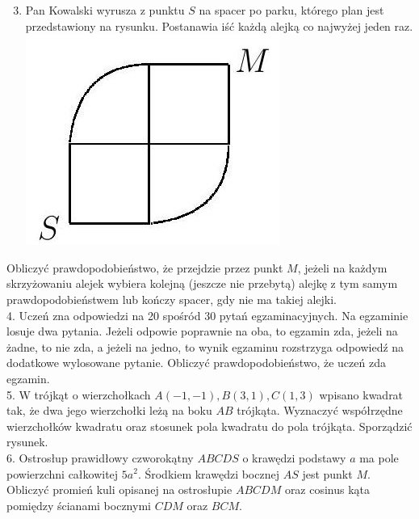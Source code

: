 \documentclass[10pt]{article}
\begin{document}
\begin{enumerate}
  \setcounter{enumi}{2}
  \item Pan Kowalski wyrusza z punktu $S$ na spacer po parku, którego plan jest przedstawiony na rysunku. Postanawia iść każdą alejką co najwyżej jeden raz.\\
\includegraphics[max width=\textwidth, center]{2024_11_16_62d9cd06022f1460c234g-10}
\end{enumerate}

Obliczyć prawdopodobieństwo, że przejdzie przez punkt $M$, jeżeli na każdym skrzyżowaniu alejek wybiera kolejną (jeszcze nie przebytą) alejkę z tym samym prawdopodobieństwem lub kończy spacer, gdy nie ma takiej alejki.\\
4. Uczeń zna odpowiedzi na 20 spośród 30 pytań egzaminacyjnych. Na egzaminie losuje dwa pytania. Jeżeli odpowie poprawnie na oba, to egzamin zda, jeżeli na żadne, to nie zda, a jeżeli na jedno, to wynik egzaminu rozstrzyga odpowiedź na dodatkowe wylosowane pytanie. Obliczyć prawdopodobieństwo, że uczeń zda egzamin.\\
5. W trójkąt o wierzchołkach $A(-1,-1), B(3,1), C(1,3)$ wpisano kwadrat tak, że dwa jego wierzchołki leżą na boku $A B$ trójkąta. Wyznaczyć współrzędne wierzchołków kwadratu oraz stosunek pola kwadratu do pola trójkąta. Sporządzić rysunek.\\
6. Ostrosłup prawidłowy czworokątny $A B C D S$ o krawędzi podstawy $a$ ma pole powierzchni całkowitej $5 a^{2}$. Środkiem krawędzi bocznej $A S$ jest punkt $M$. Obliczyć promień kuli opisanej na ostrosłupie $A B C D M$ oraz cosinus kąta pomiędzy ścianami bocznymi $C D M$ oraz $B C M$.
\end{document}
